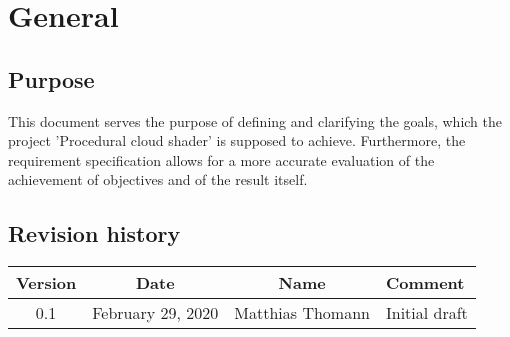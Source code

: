 \documentclass[a4paper,11pt]{article}
\begin{document}
\title{\doctitle}
\author{\docauthor}
\date{\versiondate} 

\newcommand{\docsubtitle}{Requirement specification}
\newcommand{\docauthor}{Matthias Thomann}
\newcommand{\doctitle}{Procedural cloud shader}
\newcommand{\fieldofstudies}{BSc in Computer Science}
\newcommand{\specialisation}{Computer perception and virtual reality}
\newcommand{\prof}{Prof. Urs K\"unzler}

\newcommand{\versionnumber}{0.1}
\newcommand{\versiondate}{\today}

\titlespacing*{\section} {0pt}{7.5ex plus 1ex minus .2ex}{2.3ex plus .2ex}
\titlespacing*{\subsection} {0pt}{2.25ex plus 1ex minus .2ex}{1.5ex plus .2ex}



\tableofcontents
\clearpage

\section{General}

\subsection{Purpose}
This document serves the purpose of defining and clarifying the goals, which the project 'Procedural cloud shader' is supposed to achieve. Furthermore, the requirement specification allows for a more accurate evaluation of the achievement of objectives and of the result itself.

\subsection{Revision history}

\begin{tabularx}{\textwidth}{|c|c|c|X|}
    \hline
    Version & Date & Name & Comment \\ 
    \hline
    0.1 & February 29, 2020 & Matthias Thomann & Initial draft \\ 
    \hline
\end{tabularx}

\clearpage
\end{document}
